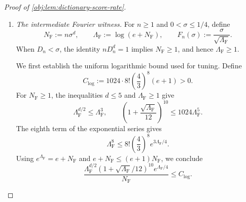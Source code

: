\documentclass[11pt]{article}
\begin{document}
\begin{proof}[Proof of \cref{obj:lem:dictionary-score-rate}]
\begin{enumerate}
For sufficiently large \(n\),
\[
0<D_n,
\qquad
n^{-2}\le D_n\le\frac18;
\]
the lower bound follows by comparing exponents, and the upper bound follows from \(D_n\to0\). Choose a dyadic bandwidth by
\[
2^{-(k+1)}<D_n\le2^{-k},
\qquad
h:=2^{-k}.
\]
Then
\[
D_n\le h<2D_n,
\qquad
n^{-2}\le h\le\frac14,
\]
so the pair belongs to the dictionary by \cref{obj:def:weight-dictionary}.

Suppose \(\sigma\le D_n\). For fixed nonnegative \(\sigma\), every factor inside \(\mathfrak s_{n,\sigma}(h)^2\) decreases as \(h\) increases. Hence
\[
\begin{aligned}
h^\beta&\le2^\beta D_n^\beta,\\
\mathfrak s_{n,\sigma}(h)
&\le\mathfrak s_{n,\sigma}(D_n)
 \le\sqrt{2^{10}e^{36}}\,D_n^\beta,
\end{aligned}
\]
where the second bound uses \(0\le\sigma/D_n\le1\) and the variance balance above. Therefore, with
\[
C_{\mathrm{direct}}
:=C_{\mathrm F,score}
\left(2^\beta+\sqrt{2^{10}e^{36}}+1\right)>0,
\]
the rounded Fourier entry satisfies
\[
A_{q_h^{\mathrm F}}^{\mathrm{ref}}
\le C_{\mathrm{direct}}D_n^\beta
=C_{\mathrm{direct}}\rho_{n,\sigma}.
\]
The equality is the direct branch of \cref{obj:def:frontier-rate}. Thus there is an integer \(n_{\mathrm{direct}}\), independent of \(\sigma\), beyond which this witness is available whenever \(\sigma\le D_n\).

\item \emph{The intermediate Fourier witness.}
For \(n\ge1\) and \(0<\sigma\le1/4\), define
\[
N_{\mathrm F}:=n\sigma^d,
\qquad
\Lambda_{\mathrm F}:=\log(e+N_{\mathrm F}),
\qquad
F_n(\sigma):=\frac{\sigma}{\sqrt{\Lambda_{\mathrm F}}}.
\]
When \(D_n<\sigma\), the identity \(nD_n^d=1\) implies \(N_{\mathrm F}\ge1\), and hence \(\Lambda_{\mathrm F}\ge1\).

We first establish the uniform logarithmic bound used for tuning. Define
\[
C_{\log}:=1024\cdot8!\left(\frac43\right)^8(e+1)>0.
\]
For \(N_{\mathrm F}\ge1\), the inequalities \(d\le5\) and \(\Lambda_{\mathrm F}\ge1\) give
\[
\Lambda_{\mathrm F}^{d/2}\le\Lambda_{\mathrm F}^3,
\qquad
\left(1+\frac{\sqrt{\Lambda_{\mathrm F}}}{12}\right)^{10}
\le1024\Lambda_{\mathrm F}^5.
\]
The eighth term of the exponential series gives
\[
\Lambda_{\mathrm F}^8
\le8!\left(\frac43\right)^8e^{3\Lambda_{\mathrm F}/4}.
\]
Using \(e^{\Lambda_{\mathrm F}}=e+N_{\mathrm F}\) and
\(e+N_{\mathrm F}\le(e+1)N_{\mathrm F}\), we conclude
\[
\frac{\Lambda_{\mathrm F}^{d/2}
\left(1+\sqrt{\Lambda_{\mathrm F}}/12\right)^{10}
e^{\Lambda_{\mathrm F}/4}}{N_{\mathrm F}}
\le C_{\log}.
\]


\end{enumerate}
\end{proof}
\end{document}
